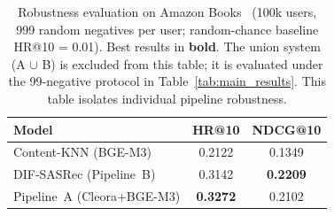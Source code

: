 \begin{table}[tbp]
\caption{Robustness evaluation on Amazon Books~\cite{hou2024amazon} (100k users, 999 random
         negatives per user; random-chance baseline HR@10 = 0.01).
         Best results in \textbf{bold}.
         The union system (A $\cup$ B) is excluded from this table; it is
         evaluated under the 99-negative protocol in Table~\ref{tab:main_results}.
         This table isolates individual pipeline robustness.}
\label{tab:robustness}
\centering
\begin{tabular}{lcc}
\toprule
\textbf{Model} & \textbf{HR@10} & \textbf{NDCG@10} \\
\midrule
Content-KNN (BGE-M3)       & 0.2122          & 0.1349          \\
DIF-SASRec (Pipeline~B)    & 0.3142          & \textbf{0.2209} \\
Pipeline~A (Cleora+BGE-M3) & \textbf{0.3272} & 0.2102          \\
\bottomrule
\end{tabular}
\end{table}
